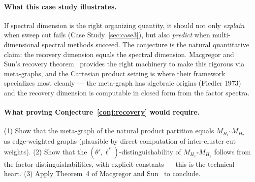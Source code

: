 \documentclass{article}
\theoremstyle{definition}
\theoremstyle{remark}
\begin{document}
\paragraph{What this case study illustrates.} If spectral dimension is the right organizing quantity, it should not only \emph{explain} when sweep cut fails (Case Study~\ref{sec:case3}), but also \emph{predict} when multi-dimensional spectral methods succeed. The conjecture is the natural quantitative claim: the recovery dimension equals the spectral dimension. Macgregor and Sun's recovery theorem~\cite{macgregor2022tighter} provides the right machinery to make this rigorous via meta-graphs, and the Cartesian product setting is where their framework specializes most cleanly --- the meta-graph has algebraic origins (Fiedler 1973) and the recovery dimension is computable in closed form from the factor spectra.

\paragraph{What proving Conjecture~\ref{conj:recovery} would require.} (1) Show that the meta-graph of the natural product partition equals $M_{H_1} \square M_{H_2}$ as edge-weighted graphs (plausible by direct computation of inter-cluster cut weights). (2) Show that the $(\theta', \ell^*)$-distinguishability of $M_{H_1} \square M_{H_2}$ follows from the factor distinguishabilities, with explicit constants --- this is the technical heart. (3) Apply Theorem~4 of Macgregor and Sun~\cite{macgregor2022tighter} to conclude.
\end{document}
